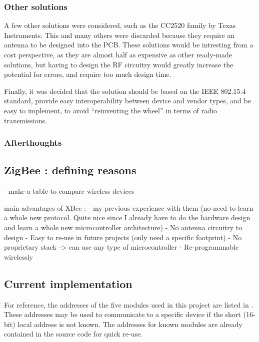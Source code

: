 \subsubsection{Other solutions}

A few other solutions were considered, such as the CC2520 family by Texas
Instruments. This and many others were discarded because
they require an antenna to be designed into the PCB. These solutions would be
intresting from a cost perspective, as they are almost half as expensive as
other ready-made solutions, but having to design the RF circuitry would greatly
increase the potential for errors, and require too much design time. 

Finally, it was decided that the solution should be based on the IEEE 802.15.4
standard, provide easy interoperability between device and vendor types, and be
easy to implement, to avoid ``reinventing the wheel'' in terms of radio
transmissions.

\subsubsection{Afterthoughts}


\subsection{ZigBee : defining reasons}
- make a table to compare wireless devices

main advantages of XBee : 
- my previous experience with them (no need to learn a
  whole new protocol. Quite nice since I already have to do the hardware design
  and learn a whole new microcontroller architecture)
- No antenna circuitry to design
- Easy to re-use in future projects (only need a specific footprint)
- No proprietary stack -> can use any type of microcontroller
- Re-programmable wirelessly


\subsection{Current implementation}
For reference, the addresses of the five modules used in this project are listed
in . These addresses may be used to communicate to a specific
device if the short (16-bit) local address is not known. The addresses for known
modules are already contained in the source code for quick re-use.

